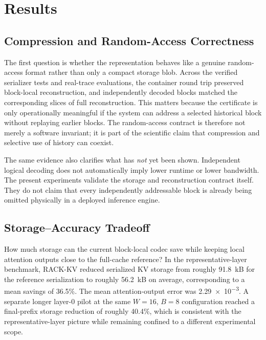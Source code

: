 \section{Results}

\subsection{Compression and Random-Access Correctness}

The first question is whether the representation behaves like a genuine random-access format rather than only a compact storage blob. Across the verified serializer tests and real-trace evaluations, the container round trip preserved block-local reconstruction, and independently decoded blocks matched the corresponding slices of full reconstruction. This matters because the certificate is only operationally meaningful if the system can address a selected historical block without replaying earlier blocks. The random-access contract is therefore not merely a software invariant; it is part of the scientific claim that compression and selective use of history can coexist.

The same evidence also clarifies what has \emph{not} yet been shown. Independent logical decoding does not automatically imply lower runtime or lower bandwidth. The present experiments validate the storage and reconstruction contract itself. They do not claim that every independently addressable block is already being omitted physically in a deployed inference engine.

\subsection{Storage--Accuracy Tradeoff}

How much storage can the current block-local codec save while keeping local attention outputs close to the full-cache reference? In the representative-layer benchmark, RACK-KV reduced serialized KV storage from roughly \num{91.8}~kB for the reference serialization to roughly \num{56.2}~kB on average, corresponding to a mean savings of \num{36.5}\%. The mean attention-output error was \num{2.29e-3}. A separate longer layer-0 pilot at the same \(W=16\), \(B=8\) configuration reached a final-prefix storage reduction of roughly \num{40.4}\%, which is consistent with the representative-layer picture while remaining confined to a different experimental scope.

\begin{table}[t]
  \centering
  \small
  
  \caption{Representative-layer comparison on \num{330} query cases. Matched-budget baselines target the serialized byte count of RACK-KV as closely as their discrete token or block choices allow.}
  \label{tab:mainresults}
\end{table}

